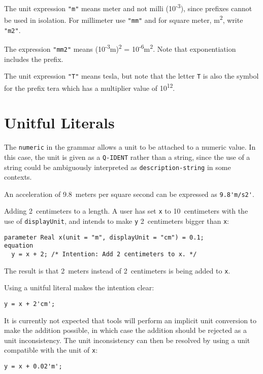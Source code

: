 \begin{example}
The unit expression \lstinline!"m"! means meter and not milli (10\textsuperscript{-3}), since prefixes cannot be used in isolation.
For millimeter use \lstinline!"mm"! and for square meter, m\textsuperscript{2}, write \lstinline!"m2"!.

The expression \lstinline!"mm2"! means (10\textsuperscript{-3}m)\textsuperscript{2} = 10\textsuperscript{-6}m\textsuperscript{2}.
Note that exponentiation includes the prefix.

The unit expression \lstinline!"T"! means tesla, but note that the letter \lstinline!T! is also the symbol for the prefix tera which has a multiplier value of 10\textsuperscript{12}.
\end{example}


\section{Unitful Literals}

The \lstinline[language=grammar]!numeric! in the grammar allows a unit to be attached to a numeric value.
In this case, the unit is given as a \lstinline[language=grammar]!Q-IDENT! rather than a string, since the use of a string could be ambiguously interpreted as \lstinline[language=grammar]!description-string! in some contexts.

\begin{example}
An acceleration of 9.8~meters per square second can be expressed as \lstinline!9.8'm/s2'!.
\end{example}

\begin{example}
Adding 2~centimeters to a length.
A user has set \lstinline!x! to 10~centimeters with the use of \lstinline!displayUnit!, and intends to make \lstinline!y! 2~centimeters bigger than \lstinline!x!:
\begin{lstlisting}[language=modelica]
  parameter Real x(unit = "m", displayUnit = "cm") = 0.1;
equation
  y = x + 2; /* Intention: Add 2 centimeters to x. */
\end{lstlisting}
The result is that 2~meters instead of 2~centimeters is being added to \lstinline!x!.

Using a unitful literal makes the intention clear:
\begin{lstlisting}[language=modelica]
  y = x + 2'cm';
\end{lstlisting}
It is currently not expected that tools will perform an implicit unit conversion to make the addition possible, in which case the addition should be rejected as a unit inconsistency.
The unit inconsistency can then be resolved by using a unit compatible with the unit of \lstinline!x!:
\begin{lstlisting}[language=modelica]
  y = x + 0.02'm';
\end{lstlisting}
\end{example}
